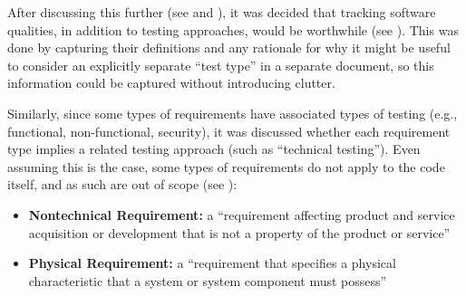 After discussing this further (see  and ),
it was decided that tracking
software qualities, in addition to testing approaches, would be worthwhile
(see ). This was done by capturing their definitions and any
rationale for why it might be useful to consider an explicitly separate
``test type'' in a separate document, so this information could be captured
without introducing clutter.

Similarly, since some types of requirements have associated types of
testing (e.g., functional, non-functional, security), it was discussed whether
each requirement type implies a related testing approach (such as ``technical
testing''). Even assuming this is the case, some types of requirements do not
apply to the code itself, and as such are out of scope (see ):

\begin{itemize}
    \item \textbf{Nontechnical Requirement:} a ``requirement affecting product
          and service acquisition or development that is not a property of
          the product or service'' \citep[p.~293]{IEEE2017}
    \item \textbf{Physical Requirement:} a ``requirement that specifies a
          physical characteristic that a system or system component must
          possess'' \citep[p.~322]{IEEE2017}
\end{itemize}
